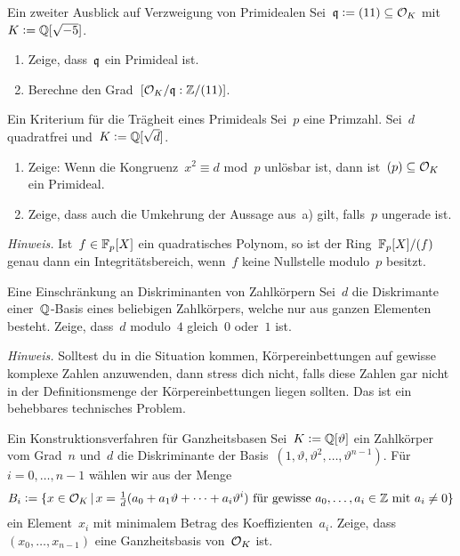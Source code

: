 \documentclass{uebblatt}
\begin{document}

\begin{aufgabe}{Ein zweiter Ausblick auf Verzweigung von Primidealen}
Sei~$\mathfrak{q} \vcentcolon= (11) \subseteq \mathcal{O}_K$ mit~$K \vcentcolon= \mathbb{Q}[\sqrt{-5}]$.
\begin{multicols}{2}
\begin{enumerate}
\item Zeige, dass~$\mathfrak{q}$ ein Primideal ist.
\item Berechne den Grad~$[\mathcal{O}_K/\mathfrak{q} : \mathbb{Z}/(11)]$.
\end{enumerate}
\end{multicols}
\vspace{-1em}
\end{aufgabe}

\begin{aufgabe}{Ein Kriterium für die Trägheit eines Primideals}
Sei~$p$ eine Primzahl. Sei~$d$ quadratfrei und~$K \vcentcolon= \mathbb{Q}[\sqrt{d}]$.
\begin{enumerate}
\item Zeige: Wenn die Kongruenz~$x^2 \equiv d$ mod~$p$ unlösbar ist,
dann ist~$(p) \subseteq \mathcal{O}_K$ ein Primideal.
\item Zeige, dass auch die Umkehrung der Aussage aus~a) gilt, falls~$p$
ungerade ist.
\end{enumerate}
{\tiny\emph{Hinweis.} Ist~$f \in \mathbb{F}_p[X]$ ein quadratisches Polynom, so ist
der Ring~$\mathbb{F}_p[X]/(f)$ genau dann ein Integritätsbereich, wenn~$f$ keine
Nullstelle modulo~$p$ besitzt.\par}
\end{aufgabe}

\begin{aufgabe}{Eine Einschränkung an Diskriminanten von Zahlkörpern}
Sei~$d$ die Diskrimante einer~$\mathbb{Q}$-Basis eines beliebigen Zahlkörpers, welche
nur aus ganzen Elementen besteht. Zeige, dass~$d$ modulo~$4$ gleich~$0$ oder~$1$ ist.

{\tiny\emph{Hinweis.} Solltest du in die Situation kommen, Körpereinbettungen
auf gewisse komplexe Zahlen anzuwenden, dann stress dich nicht, falls diese
Zahlen gar nicht in der Definitionsmenge der Körpereinbettungen liegen sollten.
Das ist ein behebbares technisches Problem.\par}
\end{aufgabe}

\begin{aufgabe}{Ein Konstruktionsverfahren für Ganzheitsbasen}
Sei~$K \vcentcolon= \mathbb{Q}[\vartheta]$ ein Zahlkörper vom Grad~$n$ und~$d$ die
Diskriminante der Basis~$(1,\vartheta,\vartheta^2,\ldots,\vartheta^{n-1})$.
Für~$i = 0, \ldots, {n-1}$ wählen wir aus der Menge
\[ B_i \vcentcolon= \{ x \in \mathcal{O}_K \,|\,
  \text{$x = \tfrac{1}{d}(a_0 + a_1\vartheta + \cdots +
  a_i\vartheta^i)$ für gewisse~$a_0,\ldots,a_i \in \mathbb{Z}$ mit~$a_i
  \neq 0$} \} \]
ein Element~$x_i$ mit minimalem Betrag des Koeffizienten~$a_i$. Zeige,
dass~$(x_0,\ldots,x_{n-1})$ eine Ganzheitsbasis von~$\mathcal{O}_K$ ist.
\end{aufgabe}
\end{document}
